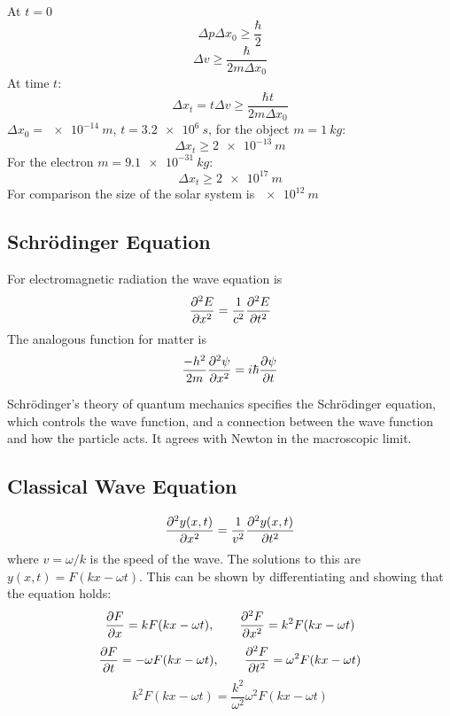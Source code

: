 \documentclass{article}
\begin{document}
    At \(t = 0\)
    \[\Delta p\Delta x_0 \ge \frac{\hbar}{2}\]
    \[\Delta v \ge \frac{\hbar}{2m\Delta x_0}\]
    At time \(t\):
    \[\Delta x_t = t\Delta v \ge\frac{\hbar t}{2m\Delta x_0}\]
    \(\Delta x_0 = \SI{e-14}{m}\), \(t = \SI{3.2e6}{s}\), for the object \(m = \SI{1}{kg}\):
    \[\Delta x_t \ge \SI{2e-13}{m}\]
    For the electron \(m = \SI{9.1e-31}{kg}\):
    \[\Delta x_t \ge \SI{2e17}{m}\]
    For comparison the size of the solar system is \(\SI{e12}{m}\)
    
    \subsection{Schr\"odinger Equation}
    For electromagnetic radiation the wave equation is
    \[\pdv[2]{E}{x} = \frac{1}{c^2}\pdv[2]{E}{t}\]
    The analogous function for matter is
    \[\frac{-h^2}{2m}\pdv[2]{\psi}{x} = i\hbar\pdv{\psi}{t}\]
    
    Schr\"odinger's theory of quantum mechanics specifies the Schr\"odinger equation, which controls the wave function, and a connection between the wave function and how the particle acts.
    It agrees with Newton in the macroscopic limit.
    
    \subsection{Classical Wave Equation}
    \[\pdv[2]{y(x, t)}{x} = \frac{1}{v^2}\pdv[2]{y(x, t)}{t}\]
    where \(v = \omega/k\) is the speed of the wave.
    The solutions to this are \(y(x, t) = F(kx-\omega t)\).
    This can be shown by differentiating and showing that the equation holds:
    \[\pdv{F}{x} = kF(kx-\omega t),\qquad \pdv[2]{F}{x} = k^2F(kx - \omega t)\]
    \[\pdv{F}{t} = -\omega F(kx - \omega t),\qquad \pdv[2]{F}{t}=\omega^2F(kx - \omega t)\]
    \[k^2F(kx-\omega t) = \frac{k^2}{\omega^2}\omega^2F(kx-\omega t)\]
    
\end{document}
